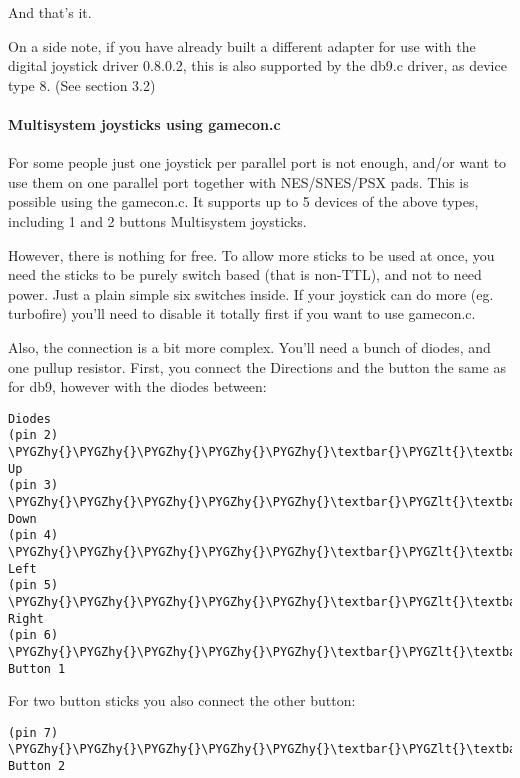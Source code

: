 \documentclass[a4paper,8pt,english]{sphinxmanual}
\def\PYGZlt{\char`\<}
\def\PYGZgt{\char`\>}
\def\PYGZhy{\char`\-}
\begin{document}
And that's it.

On a side note, if you have already built a different adapter for use with
the digital joystick driver 0.8.0.2, this is also supported by the db9.c
driver, as device type 8. (See section 3.2)


\paragraph{Multisystem joysticks using gamecon.c}
\label{input/devices/joystick-parport:multisystem-joysticks-using-gamecon-c}
For some people just one joystick per parallel port is not enough, and/or
want to use them on one parallel port together with NES/SNES/PSX pads. This is
possible using the gamecon.c. It supports up to 5 devices of the above types,
including 1 and 2 buttons Multisystem joysticks.

However, there is nothing for free. To allow more sticks to be used at
once, you need the sticks to be purely switch based (that is non-TTL), and
not to need power. Just a plain simple six switches inside. If your
joystick can do more (eg. turbofire) you'll need to disable it totally first
if you want to use gamecon.c.

Also, the connection is a bit more complex. You'll need a bunch of diodes,
and one pullup resistor. First, you connect the Directions and the button
the same as for db9, however with the diodes between:

\begin{Verbatim}[commandchars=\\\{\}]
            Diodes
(pin 2) \PYGZhy{}\PYGZhy{}\PYGZhy{}\PYGZhy{}\PYGZhy{}\textbar{}\PYGZlt{}\textbar{}\PYGZhy{}\PYGZhy{}\PYGZhy{}\PYGZhy{}\PYGZgt{} Up
(pin 3) \PYGZhy{}\PYGZhy{}\PYGZhy{}\PYGZhy{}\PYGZhy{}\textbar{}\PYGZlt{}\textbar{}\PYGZhy{}\PYGZhy{}\PYGZhy{}\PYGZhy{}\PYGZgt{} Down
(pin 4) \PYGZhy{}\PYGZhy{}\PYGZhy{}\PYGZhy{}\PYGZhy{}\textbar{}\PYGZlt{}\textbar{}\PYGZhy{}\PYGZhy{}\PYGZhy{}\PYGZhy{}\PYGZgt{} Left
(pin 5) \PYGZhy{}\PYGZhy{}\PYGZhy{}\PYGZhy{}\PYGZhy{}\textbar{}\PYGZlt{}\textbar{}\PYGZhy{}\PYGZhy{}\PYGZhy{}\PYGZhy{}\PYGZgt{} Right
(pin 6) \PYGZhy{}\PYGZhy{}\PYGZhy{}\PYGZhy{}\PYGZhy{}\textbar{}\PYGZlt{}\textbar{}\PYGZhy{}\PYGZhy{}\PYGZhy{}\PYGZhy{}\PYGZgt{} Button 1
\end{Verbatim}

For two button sticks you also connect the other button:

\begin{Verbatim}[commandchars=\\\{\}]
(pin 7) \PYGZhy{}\PYGZhy{}\PYGZhy{}\PYGZhy{}\PYGZhy{}\textbar{}\PYGZlt{}\textbar{}\PYGZhy{}\PYGZhy{}\PYGZhy{}\PYGZhy{}\PYGZgt{} Button 2
\end{Verbatim}
\end{document}
